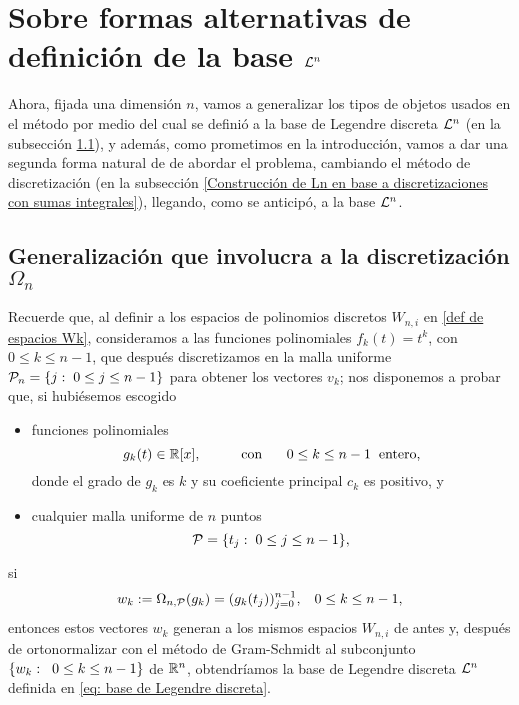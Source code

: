 \section{Sobre formas alternativas de definición de la base $\mathcal{L}^{n}$}

Ahora,
fijada una dimensión $n$,
vamos a generalizar los tipos de objetos
usados
en el método por medio del cual
se definió a la base de Legendre discreta $\mathcal{L}^{n}$
(en la subsección 
\ref{Generalización que involucra a la discretización Omega n}),
y además, como prometimos en la introducción,
vamos a dar una segunda forma natural de
de abordar el problema, cambiando el método de 
discretización
(en la subsección 
\ref{Construcción de Ln en base a discretizaciones con sumas integrales}),
llegando, como se anticipó, a la base
$\mathcal{L}^{n}$.

\subsection{Generalización que involucra a la discretización $\Omega_{n}$}
\label{Generalización que involucra a la discretización Omega n}

Recuerde que, al definir a los espacios
de polinomios discretos
$W_{n,i}$ en \eqref{def de espacios Wk},
consideramos a
las funciones polinomiales 
$f_{k}(t)=t^{k}$, con $0 \leq k \leq n-1$, que después
discretizamos en la malla uniforme
$\mathcal{P}_{n}= \{ j: \hspace{0.1cm} 0 \leq j \leq n-1 \} $
para obtener los vectores $v_{k}$; nos
disponemos a probar que, si hubiésemos escogido
\begin{itemize}
\item funciones polinomiales
\[
g_{k}(t) \in \mathbb{R}[x], \hspace{1cm} 
\text{con }\hspace{0.5cm} 0 \leq k \leq n-1 \hspace{0.2cm} \text{entero},
\]
donde
el grado de $g_{k}$ es $k$ y su coeficiente principal 
$c_{k}$ es positivo, y

\item cualquier malla uniforme de $n$ puntos
\[
\mathcal{P}=\{t_{j} : \hspace{0.1cm} 0 \leq j \leq n-1 \},
\]
\end{itemize}
si 
\begin{equation}
\label{eq1: 31Oct}
w_{k} := \Omega_{n,\mathcal{P}}(g_{k})
=(g_{k}(t_{j}))_{j=0}^{n-1}, \hspace{0.3cm} 0 \leq k \leq n-1,
\end{equation}
entonces estos vectores $w_{k}$
generan a los mismos espacios $W_{n,i}$
de antes y,
después de ortonormalizar con el 
método de Gram-Schmidt
al subconjunto $\{w_{k}: \hspace{0.2cm} 0 \leq k \leq n-1\}$
de $\mathbb{R}^{n}$, obtendríamos la 
base de Legendre discreta $\mathcal{L}^{n}$ 
definida en \eqref{eq: base de Legendre discreta}. 



